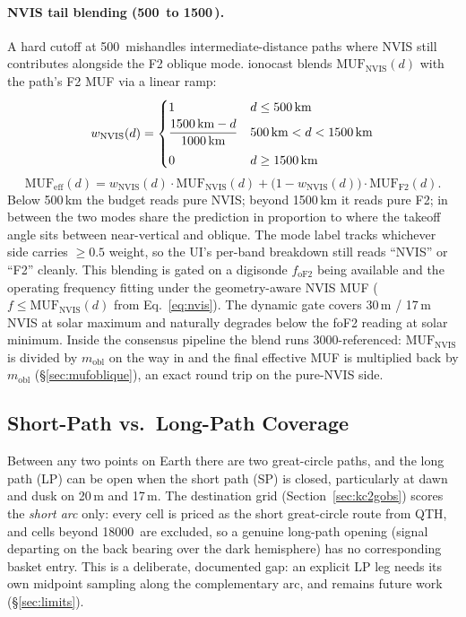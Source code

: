 \documentclass[11pt,a4paper]{article}
\newcommand{\SI}[2]{#1\,\text{#2}}
\newcommand{\km}{\text{km}}
\begin{document}
\paragraph{NVIS tail blending (\SI{500}{\km} to \SI{1500}{\km}).}
A hard cutoff at \SI{500}{\km} mishandles intermediate-distance paths
where NVIS still contributes alongside the F2 oblique mode.  ionocast
blends $\text{MUF}_{\text{NVIS}}(d)$ with the path's F2 MUF via a
linear ramp:
\begin{equation}\label{eq:nvistail}
  w_{\text{NVIS}}(d) = \begin{cases}
    1                                  & d \le \SI{500}{\km} \\[2pt]
    \dfrac{\SI{1500}{\km} - d}{\SI{1000}{\km}} & \SI{500}{\km} < d < \SI{1500}{\km} \\[8pt]
    0                                  & d \ge \SI{1500}{\km}
  \end{cases}
\end{equation}
\begin{equation*}
  \text{MUF}_{\text{eff}}(d) =
    w_{\text{NVIS}}(d) \cdot \text{MUF}_{\text{NVIS}}(d)
    + \bigl(1 - w_{\text{NVIS}}(d)\bigr) \cdot \text{MUF}_{\text{F2}}(d).
\end{equation*}
Below 500\,km the budget reads pure NVIS; beyond 1500\,km it reads
pure F2; in between the two modes share the prediction in proportion
to where the takeoff angle sits between near-vertical and oblique.
The mode label tracks whichever side carries $\ge 0.5$ weight, so
the UI's per-band breakdown still reads ``NVIS'' or ``F2'' cleanly.
This blending is gated on a digisonde $f_{\text{oF2}}$ being
available and the operating frequency fitting under the
geometry-aware NVIS MUF
($f \le \text{MUF}_{\text{NVIS}}(d)$ from Eq.~\ref{eq:nvis}).
The dynamic gate covers 30\,m / 17\,m NVIS at solar maximum and
naturally degrades below the foF2 reading at solar minimum.
Inside the consensus pipeline the blend runs 3000-referenced:
$\text{MUF}_{\text{NVIS}}$ is divided by $m_{\text{obl}}$ on the
way in and the final effective MUF is multiplied back by
$m_{\text{obl}}$ (\S\ref{sec:mufoblique}), an exact round trip on
the pure-NVIS side.

\subsection{Short-Path vs.\ Long-Path Coverage}

Between any two points on Earth there are two great-circle paths,
and the long path (LP) can be open when the short path (SP) is
closed, particularly at dawn and dusk on 20\,m and 17\,m.  The
destination grid (Section~\ref{sec:kc2gobs}) scores the
\emph{short arc} only: every cell is priced as the short
great-circle route from QTH, and cells beyond \SI{18000}{\km} are
excluded, so a genuine long-path opening (signal departing on the
back bearing over the dark hemisphere) has no corresponding
basket entry.  This is a deliberate, documented gap: an explicit
LP leg needs its own midpoint sampling along the complementary
arc, and remains future work (\S\ref{sec:limits}).
\end{document}
